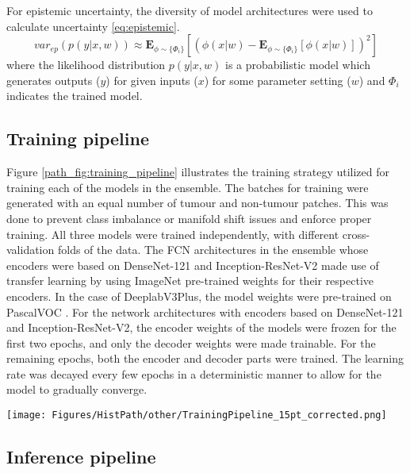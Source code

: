 \documentclass[times,twocolumn,final,authoryear]{tmp}
\begin{document}
For epistemic uncertainty, the diversity of model architectures were used to calculate uncertainty \ref{eq:epistemic}. 
\begin{equation}
 var_{ep}(p(y|x,w)) \approx \mathbf{E}_{\phi \sim \{\Phi_i\}}[(\phi(x|w) - \mathbf{E}_{\phi \sim \{\Phi_i\}}[\phi(x | w)])^2]
\label{eq:epistemic}
\end{equation}
where the likelihood distribution $p(y|x,w)$ is a probabilistic model which generates outputs ($y$) for given inputs ($x$) for some parameter setting ($w$) and $\Phi_i$ indicates the trained model.


\subsection{Training pipeline}
\label{path_sec:train_pipeline}
Figure \ref{path_fig:training_pipeline} illustrates the training strategy utilized for training each of the models in the ensemble. The batches for training were generated with an equal number of tumour and non-tumour patches. This was done to prevent class imbalance or manifold shift issues and enforce proper training. All three models were trained independently, with different cross-validation folds of the data. The FCN architectures in the ensemble whose encoders were based on DenseNet-121 and Inception-ResNet-V2 made use of transfer learning by using ImageNet \citep{deng2009imagenet} pre-trained weights for their respective encoders. In the case of DeeplabV3Plus, the model weights were pre-trained on PascalVOC \citep{everingham2010pascal}. For the network architectures with encoders based on DenseNet-121 and Inception-ResNet-V2, the encoder weights of the models were frozen for the first two epochs, and only the decoder weights were made trainable. For the remaining epochs, both the encoder and decoder parts were trained. The learning rate was decayed every few epochs in a deterministic manner to allow for the model to gradually converge.
\begin{figure*}
    \centering
    \texttt{[image: Figures/HistPath/other/TrainingPipeline\_15pt\_corrected.png]}
    \caption{Overview of the tumour segmentation training pipeline.}
    \label{path_fig:training_pipeline}
\end{figure*}

\subsection{Inference pipeline}
\label{path_sec:inference_pipeline}
\end{document}
